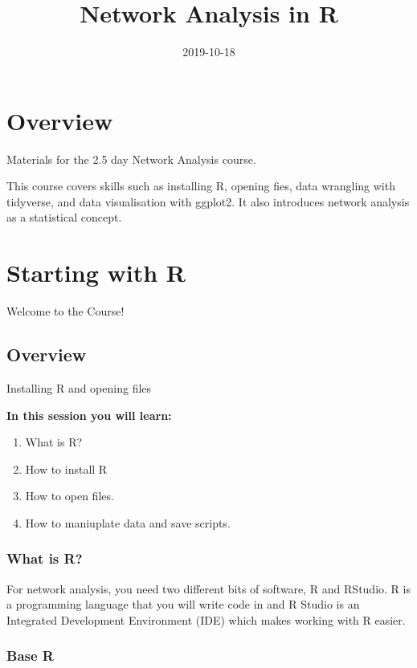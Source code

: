 \documentclass[]{book}
\title{Network Analysis in R}
\author{}
\date{2019-10-18}
\providecommand{\tightlist}{%
  \setlength{\itemsep}{0pt}\setlength{\parskip}{0pt}}
\begin{document}
\maketitle

{
\setcounter{tocdepth}{1}
\tableofcontents
}
\chapter*{Overview}\label{overview}

Materials for the 2.5 day Network Analysis course.

This course covers skills such as installing R, opening fies, data
wrangling with tidyverse, and data visualisation with ggplot2. It also
introduces network analysis as a statistical concept.

\chapter{Starting with R}\label{starting-with-r}

{Welcome to the Course!}

\section{Overview}\label{overview-1}

Installing R and opening files

\textbf{In this session you will learn:}

\begin{enumerate}
\def\labelenumi{\arabic{enumi}.}
\tightlist
\item
  What is R?
\item
  How to install R
\item
  How to open files.
\item
  How to maniuplate data and save scripts.
\end{enumerate}

\subsection{What is R?}\label{what-is-r}

For network analysis, you need two different bits of software, R and
RStudio. R is a programming language that you will write code in and R
Studio is an Integrated Development Environment (IDE) which makes
working with R easier.

\subsection{Base R}\label{base-r}
\end{document}

